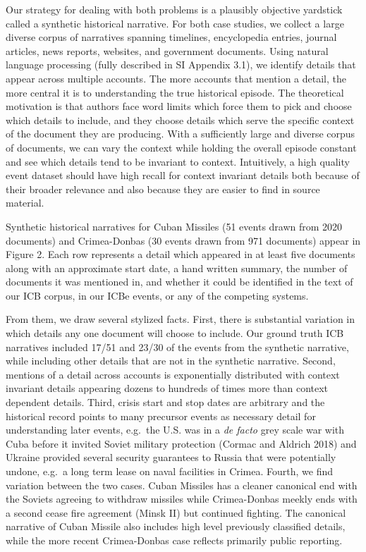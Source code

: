\documentclass{article}
\begin{document}
Our strategy for dealing with both problems is a plausibly objective
yardstick called a synthetic historical narrative. For both case
studies, we collect a large diverse corpus of narratives spanning
timelines, encyclopedia entries, journal articles, news reports,
websites, and government documents. Using natural language processing
(fully described in SI Appendix 3.1), we identify details that appear
across multiple accounts. The more accounts that mention a detail, the
more central it is to understanding the true historical episode. The
theoretical motivation is that authors face word limits which force them
to pick and choose which details to include, and they choose details
which serve the specific context of the document they are producing.
With a sufficiently large and diverse corpus of documents, we can vary
the context while holding the overall episode constant and see which
details tend to be invariant to context. Intuitively, a high quality
event dataset should have high recall for context invariant details both
because of their broader relevance and also because they are easier to
find in source material.

Synthetic historical narratives for Cuban Missiles (51 events drawn from
2020 documents) and Crimea-Donbas (30 events drawn from 971 documents)
appear in Figure 2. Each row represents a detail which appeared in at
least five documents along with an approximate start date, a hand
written summary, the number of documents it was mentioned in, and
whether it could be identified in the text of our ICB corpus, in our
ICBe events, or any of the competing systems.

From them, we draw several stylized facts. First, there is substantial
variation in which details any one document will choose to include. Our
ground truth ICB narratives included 17/51 and 23/30 of the events from
the synthetic narrative, while including other details that are not in
the synthetic narrative. Second, mentions of a detail across accounts is
exponentially distributed with context invariant details appearing
dozens to hundreds of times more than context dependent details. Third,
crisis start and stop dates are arbitrary and the historical record
points to many precursor events as necessary detail for understanding
later events, e.g.~the U.S. was in a \textit{de facto} grey scale war
with Cuba before it invited Soviet military protection (Cormac and
Aldrich 2018) and Ukraine provided several security guarantees to Russia
that were potentially undone, e.g.~a long term lease on naval facilities
in Crimea. Fourth, we find variation between the two cases. Cuban
Missiles has a cleaner canonical end with the Soviets agreeing to
withdraw missiles while Crimea-Donbas meekly ends with a second cease
fire agreement (Minsk II) but continued fighting. The canonical
narrative of Cuban Missile also includes high level previously
classified details, while the more recent Crimea-Donbas case reflects
primarily public reporting.
\end{document}
